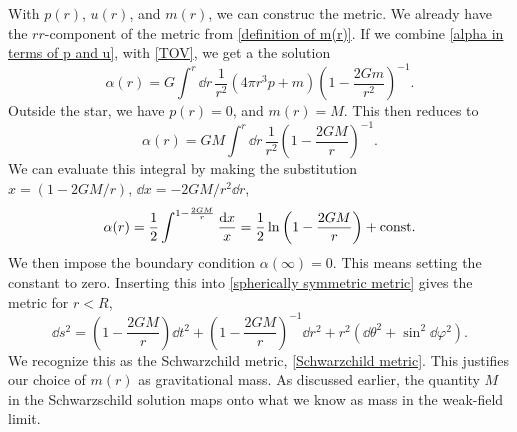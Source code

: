 With $p(r)$, $u(r)$, and $m(r)$, we can construc the metric.
We already have the $rr$-component of the metric from \autoref{definition of m(r)}.
If we combine \autoref{alpha in terms of p and u}, with \autoref{TOV}, we get a the solution
%
\begin{equation}
    \label{solution to alpha}
    \alpha(r) = G \int^r \dd r \, \frac{1}{r^2} (4 \pi r^3 p + m)
    \left(1 - \frac{2 G m}{r^2} \right)^{-1}.
\end{equation}
%
Outside the star, we have $p(r) = 0$, and $m(r) = M$.
This then reduces to
%
\begin{equation}
    \alpha(r) = G M \int^r \dd r \, \frac{1}{r^2} \left(1 - \frac{2 G M}{r}\right)^{-1}.
\end{equation}
%
We can evaluate this integral by making the substitution $x = (1 - 2GM/r), \, \dd x = - 2GM/r^2 \dd r$,
%
\begin{equation}
    \alpha(r) = \frac{1}{2} \int^{1-\frac{2GM}{r}} \frac{\dd x}{x}
    = \frac{1}{2} \ln \left(1 - \frac{2GM}{r}\right) + \mathrm{const.}
\end{equation}
%
We then impose the boundary condition $\alpha(\infty) = 0$.
This means setting the constant to zero.
Inserting this into \autoref{spherically symmetric metric} gives the metric for $r<R$,
%
\begin{equation}
    \dd s^2
    =
    \left(1 - \frac{2GM}{r}\right) \dd t^2
    + \left(1 - \frac{2 G M}{r}\right)^{-1} \dd r^2
    + r^2 \left(\dd \theta^2 + \sin^2\dd\varphi^2\right).
\end{equation}
%
We recognize this as the Schwarzchild metric, \autoref{Schwarzchild metric}.
This justifies our choice of $m(r)$ as gravitational mass.
As discussed earlier, the quantity $M$ in the Schwarzschild solution maps onto what we know as mass in the weak-field limit.



